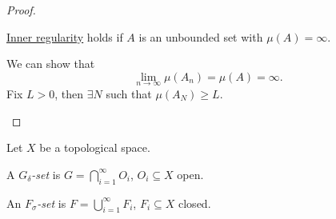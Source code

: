 \begin{proof}
\begin{enumerate}[(a)]
		      \begin{claim}
			      \hyperref[thm:inner-regularity]{Inner regularity} holds if \(A\) is an unbounded set with \(\mu (A) = \infty \).
		      \end{claim}
		      \begin{explanation}
			      We can show that
			      \[
				      \lim_{n \to \infty} \mu (A_{n}) = \mu (A) = \infty.
			      \]
			      Fix \(L>0\), then \(\exists N\) such that \(\mu (A_{N})\geq L\).
		      \end{explanation}
	\end{enumerate}
\end{proof}

\begin{definition*}
	Let \(X\) be a topological space.
	\begin{definition}\label{def:G-delta-set}
		A \emph{\(G_{\delta}\)-set} is \(G = \bigcap_{i=1}^{\infty} O_{i}\), \(O_{i} \subseteq X\) open.
	\end{definition}

	\begin{definition}\label{def:F-sigma-set}
		An \emph{\(F_{\sigma}\)-set} is \(F = \bigcup_{i=1}^{\infty} F_{i}\), \(F_{i} \subseteq X\) closed.
	\end{definition}
\end{definition*}

